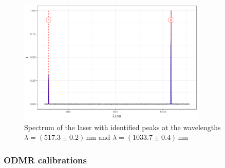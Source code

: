 \begin{figure}
	\centering
	\includegraphics[width=0.8\textwidth]{../figures/laserspectrum.png}
	\caption[Spectrum of the laser]{Spectrum of the laser with identified peaks at the wavelengths $\lambda=(517.3\pm0.2)\,\mathrm{nm}$ and $\lambda=(1033.7\pm0.4)\,\mathrm{nm}$}
	\label{fig:laserspectrum}
\end{figure}

\subsubsection{ODMR calibrations}
